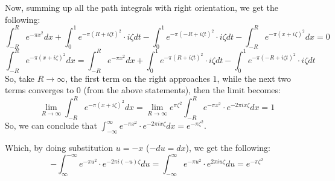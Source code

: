 \documentclass{article}
\begin{document}
\begin{itemize}
    Now, summing up all the path integrals with right orientation, we get the following:
    $$\int_{-R}^{R}e^{-\pi x^2}dx+\int_{0}^{1}e^{-\pi(R+i\zeta t)^2}\cdot i\zeta dt -\int_{0}^{1}e^{-\pi(-R+i\zeta t)^2}\cdot i\zeta dt-\int_{-R}^{R}e^{-\pi(x+i\zeta)^2}dx=0$$
    $$\int_{-R}^{R}e^{-\pi(x+i\zeta)^2}dx=\int_{-R}^{R}e^{-\pi x^2}dx+\int_{0}^{1}e^{-\pi(R+i\zeta t)^2}\cdot i\zeta dt -\int_{0}^{1}e^{-\pi(-R+i\zeta t)^2}\cdot i\zeta dt$$
    So, take $R\rightarrow\infty$, the first term on the right approaches $1$, while the next two terms converges to $0$ (from the above statements), then the limit becomes:
    $$\lim_{R\rightarrow\infty}\int_{-R}^{R}e^{-\pi(x+i\zeta)^2}dx = \lim_{R\rightarrow\infty}e^{\pi\zeta^2}\int_{-R}^{R}e^{-\pi x^2}\cdot e^{-2\pi ix\zeta}dx = 1$$
    So, we can conclude that $\int_{-\infty}^{\infty}e^{-\pi x^2}\cdot e^{-2\pi ix\zeta}dx = e^{-\pi\zeta^2}$.

    Which, by doing substitution $u=-x$ ($-du=dx$), we get the following:
    $$-\int_{\infty}^{-\infty}e^{-\pi u^2}\cdot e^{-2\pi i(-u)\zeta} du = \int_{-\infty}^{\infty}e^{-\pi u^2}\cdot e^{2\pi iu\zeta}du = e^{-\pi\zeta^2}$$

    \hfil

\end{itemize}
\end{document}
